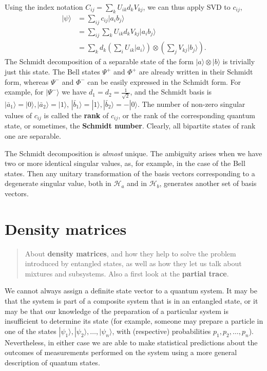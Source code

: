 \documentclass[fleqn]{article}
\let\oldsection\section
\renewcommand\section{\clearpage\oldsection}
\begin{document}
Using the index notation \(C_{ij} = \sum_k U_{ik}d_k V_{kj}\), we can thus apply SVD to \(c_{ij}\),
\[
  \begin{aligned}
    |\psi\rangle
    &= \sum_{ij} c_{ij}|a_ib_j\rangle
  \\&= \sum_{ij} \sum_k U_{ik}d_k V_{kj}|a_ib_j\rangle
  \\&= \sum_k d_k \left(\sum_i U_{ik}|a_i\rangle\right)\otimes\left(\sum_j V_{kj}|b_j\rangle\right).
  \end{aligned}
\]
The Schmidt decomposition of a separable state of the form
\(|a\rangle\otimes|b\rangle\) is trivially just this state.
The Bell states \(\Psi^+\) and \(\Phi^+\) are already written in their Schmidt form, whereas \(\Psi^-\) and \(\Phi^-\) can be easily expressed in the Schmidt form.
For example, for \(|\Psi^-\rangle\) we have \(d_1 = d_2 = \frac{1}{\sqrt 2}\), and the Schmidt basis is \(|\bar a_1\rangle =|0\rangle, |\bar a_2\rangle=|1\rangle\), \(|\bar b_1\rangle = |1\rangle, |\bar b_2\rangle=-|0\rangle\).
The number of non-zero singular values of \(c_{ij}\) is called the \textbf{rank} of \(c_{ij}\), or the rank of the corresponding quantum state, or sometimes, the \textbf{Schmidt number}.
Clearly, all bipartite states of rank one are separable.

The Schmidt decomposition is \emph{almost} unique.
The ambiguity arises when we have two or more identical singular values, as, for example, in the case of the Bell states.
Then any unitary transformation of the basis vectors corresponding to a degenerate singular value, both in \(\mathcal{H}_a\) and in \(\mathcal{H}_b\), generates another set of basis vectors.

\hypertarget{density-matrices}{%
\section{Density matrices}\label{density-matrices}}

\begin{quote}
About \textbf{density matrices}, and how they help to solve the problem introduced by entangled states, as well as how they let us talk about mixtures and subsystems.
Also a first look at the \textbf{partial trace}.
\end{quote}

We cannot always assign a definite state vector to a quantum system.
It may be that the system is part of a composite system that is in an entangled state, or it may be that our knowledge of the preparation of a particular system is insufficient to determine its state (for example, someone may prepare a particle in one of the states \(|\psi_1\rangle, |\psi_2\rangle, \ldots, |\psi_n\rangle\), with (respective) probabilities \(p_1, p_2, \ldots, p_n\)).
Nevertheless, in either case we are able to make statistical predictions about the outcomes of measurements performed on the system using a more general description of quantum states.
\end{document}
